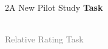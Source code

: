 \documentclass[xcolor=table,9pt,aspectratio=169]{beamer}
\begin{document}
\begin{frame}{\vspace*{10mm}2\hspace*{1em}A New Pilot Study}
   \textbf{Task}
   \begin{center}
      \\
      \textcolor{gray}{Relative Rating Task}
   \end{center}
\end{frame}
\end{document}
